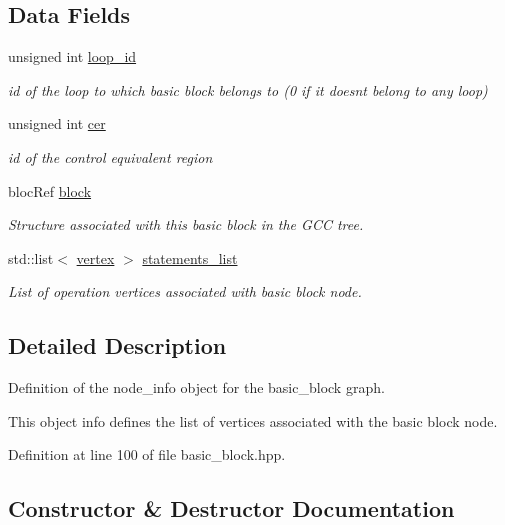 \subsection*{Data Fields}
\begin{DoxyCompactItemize}
\item 
unsigned int \hyperlink{structBBNodeInfo_acbdf26d1151e519acbaaae9d5abedc94}{loop\+\_\+id}
\begin{DoxyCompactList}\small\item\em id of the loop to which basic block belongs to (0 if it doesn\textquotesingle{}t belong to any loop) \end{DoxyCompactList}\item 
unsigned int \hyperlink{structBBNodeInfo_a4cd45e5f9383ffe98e751a33ae1f1633}{cer}
\begin{DoxyCompactList}\small\item\em id of the control equivalent region \end{DoxyCompactList}\item 
bloc\+Ref \hyperlink{structBBNodeInfo_a1e0c9fddf2bc58caafddaecb7163c8b5}{block}
\begin{DoxyCompactList}\small\item\em Structure associated with this basic block in the G\+CC tree. \end{DoxyCompactList}\item 
std\+::list$<$ \hyperlink{graph_8hpp_abefdcf0544e601805af44eca032cca14}{vertex} $>$ \hyperlink{structBBNodeInfo_a209fdd5fbe87c3f104221f20c81e0984}{statements\+\_\+list}
\begin{DoxyCompactList}\small\item\em List of operation vertices associated with basic block node. \end{DoxyCompactList}\end{DoxyCompactItemize}


\subsection{Detailed Description}
Definition of the node\+\_\+info object for the basic\+\_\+block graph. 

This object info defines the list of vertices associated with the basic block node. 

Definition at line 100 of file basic\+\_\+block.\+hpp.



\subsection{Constructor \& Destructor Documentation}
\mbox{\label{structBBNodeInfo_a723cf7c7bc69baf4b23553951df9f949}} 
